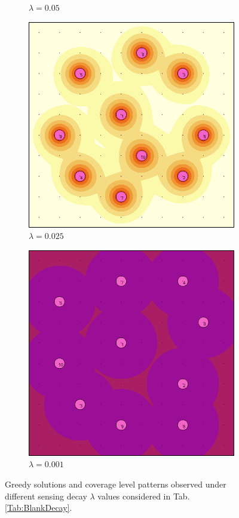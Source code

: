 \documentclass[letterpaper, 10 pt, conference]{ieeeconf}
\begin{document}
\begin{figure}[!h]
\begin{subfigure}[t]{0.3\columnwidth}
    \caption{$\lambda = 0.05$}
\end{subfigure}%
\hfill
\begin{subfigure}[t]{0.3\columnwidth}
    \centering
    \includegraphics[width=\columnwidth]{Figures/BlankDecay025.png}
    \caption{$\lambda = 0.025$}
\end{subfigure}%
\hfill
\begin{subfigure}[t]{0.3\columnwidth}
    \centering
    \includegraphics[width=\columnwidth]{Figures/BlankDecay001.png}
    \caption{$\lambda = 0.001$}
\end{subfigure}%
\caption{Greedy solutions and coverage level patterns observed under different sensing decay $\lambda$ values considered in Tab. \ref{Tab:BlankDecay}.}
\label{Fig:BlankDecay}
\end{figure}
\end{document}
